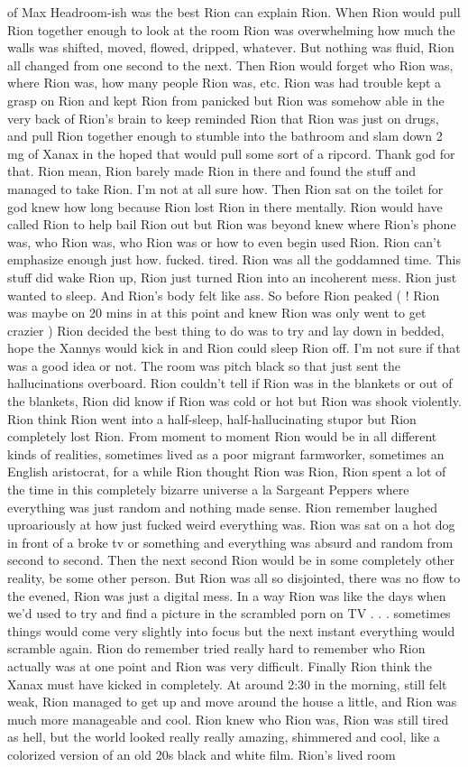 \documentclass[12pt]{book}
\begin{document}
of Max Headroom-ish was the best Rion can explain Rion. When Rion would pull Rion together enough to look at the room Rion was overwhelming how much the walls was shifted, moved, flowed, dripped, whatever. But nothing was fluid, Rion all changed from one second to the next. Then Rion would forget who Rion was, where Rion was, how many people Rion was, etc. Rion was had trouble kept a grasp on Rion and kept Rion from panicked but Rion was somehow able in the very back of Rion's brain to keep reminded Rion that Rion was just on drugs, and pull Rion together enough to stumble into the bathroom and slam down 2 mg of Xanax in the hoped that would pull some sort of a ripcord. Thank god for that. Rion mean, Rion barely made Rion in there and found the stuff and managed to take Rion. I'm not at all sure how. Then Rion sat on the toilet for god knew how long because Rion lost Rion in there mentally. Rion would have called Rion to help bail Rion out but Rion was beyond knew where Rion's phone was, who Rion was, who Rion was or how to even begin used Rion. Rion can't emphasize enough just how. fucked. tired. Rion was all the goddamned time. This stuff did wake Rion up, Rion just turned Rion into an incoherent mess. Rion just wanted to sleep. And Rion's body felt like ass. So before Rion peaked ( ! Rion was maybe on 20 mins in at this point and knew Rion was only went to get crazier ) Rion decided the best thing to do was to try and lay down in bedded, hope the Xannys would kick in and Rion could sleep Rion off. I'm not sure if that was a good idea or not. The room was pitch black so that just sent the hallucinations overboard. Rion couldn't tell if Rion was in the blankets or out of the blankets, Rion did know if Rion was cold or hot but Rion was shook violently. Rion think Rion went into a half-sleep, half-hallucinating stupor but Rion completely lost Rion. From moment to moment Rion would be in all different kinds of realities, sometimes lived as a poor migrant farmworker, sometimes an English aristocrat, for a while Rion thought Rion was Rion, Rion spent a lot of the time in this completely bizarre universe a la Sargeant Peppers where everything was just random and nothing made sense. Rion remember laughed uproariously at how just fucked weird everything was. Rion was sat on a hot dog in front of a broke tv or something and everything was absurd and random from second to second. Then the next second Rion would be in some completely other reality, be some other person. But Rion was all so disjointed, there was no flow to the evened, Rion was just a digital mess. In a way Rion was like the days when we'd used to try and find a picture in the scrambled porn on TV . . .  sometimes things would come very slightly into focus but the next instant everything would scramble again. Rion do remember tried really hard to remember who Rion actually was at one point and Rion was very difficult. Finally Rion think the Xanax must have kicked in completely. At around 2:30 in the morning, still felt weak, Rion managed to get up and move around the house a little, and Rion was much more manageable and cool. Rion knew who Rion was, Rion was still tired as hell, but the world looked really really amazing, shimmered and cool, like a colorized version of an old 20s black and white film. Rion's lived room 
\end{document}
